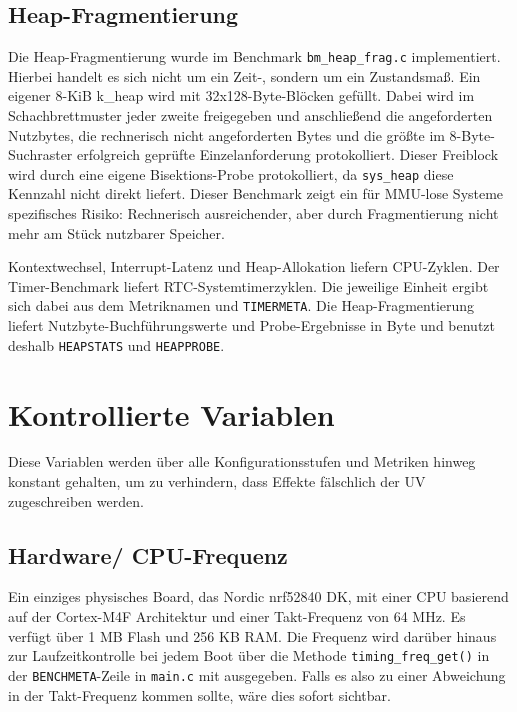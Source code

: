 \subsection{Heap-Fragmentierung}
Die Heap-Fragmentierung wurde im Benchmark \lstinline[style=fileinline]|bm_heap_frag.c| implementiert. Hierbei handelt es sich nicht um ein Zeit-, sondern um ein Zustandsma{\ss}. Ein eigener 8-KiB k\_heap wird mit 32x128-Byte-Bl{\"o}cken gef{\"u}llt. Dabei wird im Schachbrettmuster jeder zweite freigegeben und anschlie{\ss}end die angeforderten Nutzbytes, die rechnerisch nicht angeforderten Bytes und die gr{\"o}{\ss}te im 8-Byte-Suchraster erfolgreich gepr{\"u}fte Einzelanforderung protokolliert. Dieser Freiblock wird durch eine eigene Bisektions-Probe protokolliert, da \lstinline[style=fileinline]|sys_heap| diese Kennzahl nicht direkt liefert. Dieser Benchmark zeigt ein f{\"u}r MMU-lose Systeme spezifisches Risiko: Rechnerisch ausreichender, aber durch Fragmentierung nicht mehr am St{\"u}ck nutzbarer Speicher.

Kontextwechsel, Interrupt-Latenz und Heap-Allokation liefern CPU-Zyklen. Der Timer-Benchmark liefert RTC-Systemtimerzyklen. Die jeweilige Einheit ergibt sich dabei aus dem Metriknamen und \lstinline[style=fileinline]|TIMERMETA|. Die Heap-Fragmentierung liefert Nutzbyte-Buchf{\"u}hrungswerte und Probe-Ergebnisse in Byte und benutzt deshalb \lstinline[style=fileinline]|HEAPSTATS| und \lstinline[style=fileinline]|HEAPPROBE|.

\section{Kontrollierte Variablen}
Diese Variablen werden {\"u}ber alle Konfigurationsstufen und Metriken hinweg konstant gehalten, um zu verhindern, dass Effekte f{\"a}lschlich der UV zugeschreiben werden.

\subsection{Hardware/ CPU-Frequenz}
Ein einziges physisches Board, das Nordic nrf52840 DK, mit einer CPU basierend auf der Cortex-M4F Architektur und einer Takt-Frequenz von 64 MHz. Es verf{\"u}gt {\"u}ber 1 MB Flash und 256 KB RAM. Die Frequenz wird dar{\"u}ber hinaus zur Laufzeitkontrolle bei jedem Boot {\"u}ber die Methode \lstinline[style=fileinline]|timing_freq_get()| in der \lstinline[style=fileinline]|BENCHMETA|-Zeile in \lstinline[style=fileinline]|main.c| mit ausgegeben. Falls es also zu einer Abweichung in der Takt-Frequenz kommen sollte, w{\"a}re dies sofort sichtbar.

